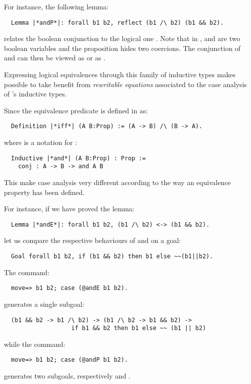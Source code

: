 For instance, the following lemma:
\begin{lstlisting}
  Lemma |*andP*|: forall b1 b2, reflect (b1 /\ b2) (b1 && b2).
\end{lstlisting}
relates the boolean conjunction \C{&&} to
the logical one \C{/\\}.
Note that in ,  and  are two boolean variables and
the proposition  hides two coercions.
The conjunction of  and  can then be viewed
as   or as .


Expressing logical equivalences through this family of inductive types
makes possible to take benefit from \emph{rewritable equations}
associated to the case analysis of \Coq{}'s inductive types.

Since the equivalence predicate is defined in \Coq{} as:
\begin{lstlisting}
  Definition |*iff*| (A B:Prop) := (A -> B) /\ (B -> A).
\end{lstlisting}
where \C{/\\} is a notation for :
\begin{lstlisting}
  Inductive |*and*| (A B:Prop) : Prop :=
    conj : A -> B -> and A B
\end{lstlisting}

This make case analysis very different according to the way an
equivalence property has been defined.


For instance, if we have proved the lemma:
\begin{lstlisting}
  Lemma |*andE*|: forall b1 b2, (b1 /\ b2) <-> (b1 && b2).
\end{lstlisting}
let us compare the respective behaviours of  and  on a
goal:
\begin{lstlisting}
  Goal forall b1 b2, if (b1 && b2) then b1 else ~~(b1||b2).
\end{lstlisting}

The command:
\begin{lstlisting}
  move=> b1 b2; case (@andE b1 b2).
\end{lstlisting}
generates a single subgoal:
\begin{lstlisting}
  (b1 && b2 -> b1 /\ b2) -> (b1 /\ b2 -> b1 && b2) ->
                   if b1 && b2 then b1 else ~~ (b1 || b2)
\end{lstlisting}

while the command:
\begin{lstlisting}
  move=> b1 b2; case (@andP b1 b2).
\end{lstlisting}
generates two subgoals, respectively  and
.



